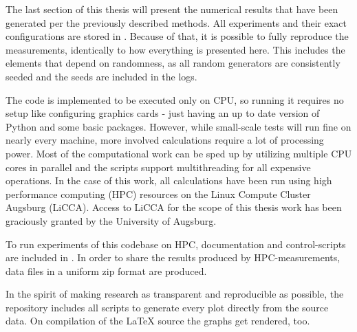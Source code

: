 The last section of this thesis will present the numerical results that have been generated per the previously described methods.
All experiments and their exact configurations are stored in 
.
Because of that, it is possible to fully reproduce the measurements, identically to how everything is presented here.
This includes the elements that depend on randomness, as all random generators are consistently seeded and the seeds are included in the logs.

The code is implemented to be executed only on CPU, so running it requires no setup like configuring graphics cards - just having an up to date version of Python and some basic packages.
However, while small-scale tests will run fine on nearly every machine, more involved calculations require a lot of processing power.
Most of the computational work can be sped up by utilizing multiple CPU cores in parallel and the scripts support multithreading for all expensive operations.
In the case of this work, all calculations have been run using high performance computing (HPC) resources on the Linux Compute Cluster Augsburg (LiCCA).
Access to LiCCA for the scope of this thesis work has been graciously granted by the University of Augsburg.

To run experiments of this codebase on HPC, documentation and control-scripts are included in .
In order to share the results produced by HPC-measurements, data files in a uniform zip format are produced.

In the spirit of making research as transparent and reproducible as possible, the repository  includes all scripts to generate every plot directly from the source data.
On compilation of the \LaTeX{} source the graphs get rendered, too.
